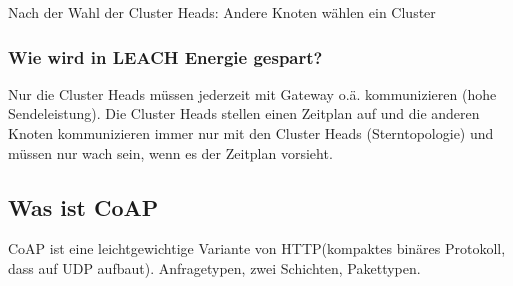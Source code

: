 	Nach der Wahl der Cluster\- Heads: Andere Knoten wählen ein Cluster
	
	
	\subsubsection{Wie wird in LEACH Energie gespart?}
	Nur die Cluster\- Heads müssen jederzeit mit Gateway o.ä. kommunizieren (hohe Sendeleistung).
	Die Cluster\- Heads stellen einen Zeitplan auf und die anderen Knoten kommunizieren immer nur mit den Cluster\- Heads (Sterntopologie) und müssen nur wach sein, wenn es der Zeitplan vorsieht.
	
	\subsection{Was ist CoAP}
	CoAP ist eine leichtgewichtige Variante von HTTP(kompaktes binäres Protokoll, dass auf UDP aufbaut).
	Anfragetypen, zwei Schichten, Pakettypen.
	
	
						

